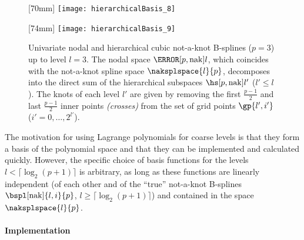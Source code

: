 \begin{figure}
  [70mm]{%
    \texttt{[image: hierarchicalBasis\_8]}%
  }%
  \hfill%
  \hfill%
  [74mm]{%
    \texttt{[image: hierarchicalBasis\_9]}%
  }%
  \caption[%
    Nodal and hierarchical not-a-knot B-splines%
  ]{%
    Univariate nodal and hierarchical cubic not-a-knot B-splines ($p = 3$)
    up to level $l = 3$.
    The nodal space $\nsbspl[\nak]{l}{p}$,
    which coincides with the not-a-knot spline space $\naksplspace{l}{p}$,
    decomposes into the direct sum
    of the hierarchical subspaces $\hsbspl[\nak]{l'}{p}$ ($l' \le l$).
    The knots of each level $l'$ are given by removing the
    first $\tfrac{p-1}{2}$ and last $\tfrac{p-1}{2}$
    inner points \emph{(crosses)}
    from the set of grid points $\gp{l',i'}$
    ($i' = 0, \dotsc, 2^{l'}$).%
  }%
  \label{fig:notAKnotBSpline}%
\end{figure}

The motivation for using Lagrange polynomials for coarse levels
is that they form a basis of the polynomial space
and that they can be implemented and calculated quickly.
However, the specific choice of basis functions for the levels
$l < \lceil\log_2(p + 1)\rceil$ is arbitrary,
as long as these functions are linearly independent
(of each other and of the ``true'' not-a-knot B-splines
$\bspl[\nak]{l,i}{p}$, $l \ge \lceil\log_2(p+1)\rceil$)
and contained in the space $\naksplspace{l}{p}$.

\paragraph{Implementation}

